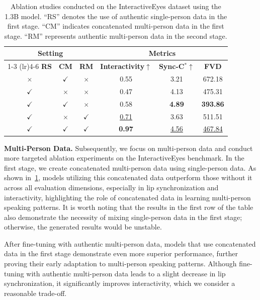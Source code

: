 \begin{table}[t]
    \centering
    \small
    \caption{
        Ablation studies conducted on the InteractiveEyes dataset using the 1.3B model. 
        ``RS'' denotes the use of authentic single-person data in the first stage. 
        ``CM'' indicates concatenated multi-person data in the first stage. 
        ``RM'' represents authentic multi-person data in the second stage.
    }
    \begin{tabular}{cccccc}
        \toprule
        \multicolumn{3}{c}{\textbf{Setting}} & \multicolumn{3}{c}{\textbf{Metrics}} \\
        \cmidrule(lr){1-3} \cmidrule(lr){4-6}
        \textbf{RS} & \textbf{CM} & \textbf{RM} & \textbf{Interactivity$\uparrow$}& \textbf{Sync-C$^{*}$$\uparrow$} & \textbf{FVD}  \\
        \midrule
        $\times$ & $\checkmark$ & $\times$ & 0.55 & 3.21 & 672.18  \\
        $\checkmark$ & $\times$ & $\times$ & 0.47 & 4.13 & 475.31  \\
        $\checkmark$ & $\checkmark$ & $\times$ & 0.58 & \textbf{4.89} & \textbf{393.86}  \\
        \midrule
        $\checkmark$ & $\times$ & $\checkmark$ & \underline{0.71} & 3.63 & 511.51 \\
        $\checkmark$ & $\checkmark$ & $\checkmark$ & \textbf{0.97} & \underline{4.56} & \underline{467.84}  \\
        \bottomrule
    \end{tabular}
    \label{tab:ab-data}
\end{table}



\noindent \textbf{Multi-Person Data.}
Subsequently, we focus on multi-person data and conduct more targeted ablation experiments on the InteractiveEyes benchmark. 
In the first stage, we create concatenated multi-person data using single-person data. As shown in~\cref{tab:ab-data}, models utilizing this concatenated data outperform those without it across all evaluation dimensions, especially in lip synchronization and interactivity, highlighting the role of concatenated data in learning multi-person speaking patterns. 
It is worth noting that the results in the first row of the table also demonstrate the necessity of mixing single-person data in the first stage; otherwise, the generated results would be unstable.

After fine-tuning with authentic multi-person data, models that use concatenated data in the first stage demonstrate even more superior performance, further proving their early adaptation to multi-person speaking patterns. 
Although fine-tuning with authentic multi-person data leads to a slight decrease in lip synchronization, it significantly improves interactivity, which we consider a reasonable trade-off.

